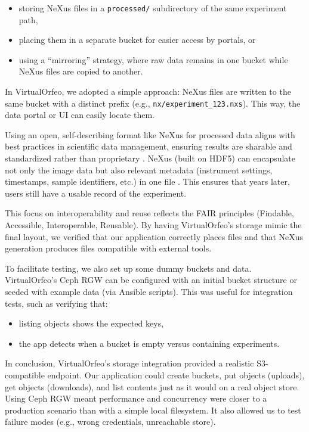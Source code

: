 \begin{itemize}
	\item storing NeXus files in a \texttt{processed/} subdirectory of the same 
	experiment path,  
	\item placing them in a separate bucket for easier access by portals, or  
	\item using a ``mirroring'' strategy, where raw data remains in one bucket 
	while NeXus files are copied to another.  
\end{itemize}

In VirtualOrfeo, we adopted a simple approach: NeXus files are written to the 
same bucket with a distinct prefix (e.g., \texttt{nx/experiment\_123.nxs}). This 
way, the data portal or UI can easily locate them.

\medskip

Using an open, self-describing format like NeXus for processed data aligns with 
best practices in scientific data management, ensuring results are sharable and 
standardized rather than proprietary \parencite{Koennecke2015NeXusFormat, 
	Korir2024TenRecs}. NeXus (built on HDF5) can encapsulate not only the image data 
but also relevant metadata (instrument settings, timestamps, sample identifiers, 
etc.) in one file \parencite{Koennecke2015NeXusFormat}. This ensures that years 
later, users still have a usable record of the experiment.  

This focus on interoperability and reuse reflects the FAIR principles (Findable, 
Accessible, Interoperable, Reusable). By having VirtualOrfeo’s storage mimic the 
final layout, we verified that our application correctly places files and that 
NeXus generation produces files compatible with external tools.

\medskip

To facilitate testing, we also set up some dummy buckets and data. VirtualOrfeo’s 
Ceph RGW can be configured with an initial bucket structure or seeded with 
example data (via Ansible scripts). This was useful for integration tests, such 
as verifying that:  

\begin{itemize}
	\item listing objects shows the expected keys,  
	\item the app detects when a bucket is empty versus containing experiments.  
\end{itemize}

\medskip

In conclusion, VirtualOrfeo’s storage integration provided a realistic 
S3-compatible endpoint. Our application could create buckets, put objects 
(uploads), get objects (downloads), and list contents just as it would on a real 
object store. Using Ceph RGW meant performance and concurrency were closer to a 
production scenario than with a simple local filesystem. It also allowed us to 
test failure modes (e.g., wrong credentials, unreachable store).  

